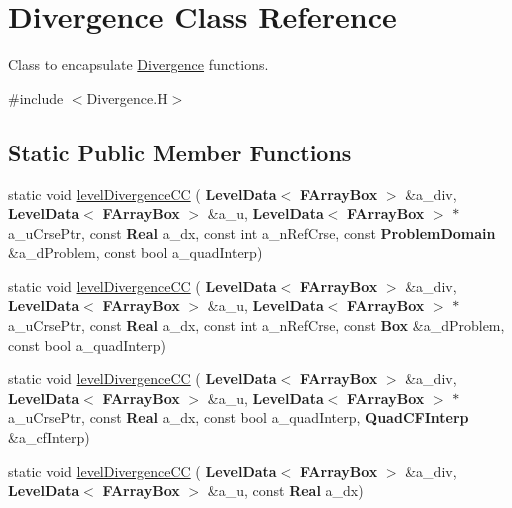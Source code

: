 \hypertarget{class_divergence}{}\section{Divergence Class Reference}
\label{class_divergence}


Class to encapsulate \hyperlink{class_divergence}{Divergence} functions.  




{\ttfamily \#include $<$Divergence.\+H$>$}

\subsection*{Static Public Member Functions}
\begin{DoxyCompactItemize}
\item 
static void \hyperlink{class_divergence_a85ddcbfb1ed4cd7e6624c33d0bd918f3}{level\+Divergence\+CC} (\textbf{ Level\+Data}$<$ \textbf{ F\+Array\+Box} $>$ \&a\+\_\+div, \textbf{ Level\+Data}$<$ \textbf{ F\+Array\+Box} $>$ \&a\+\_\+u, \textbf{ Level\+Data}$<$ \textbf{ F\+Array\+Box} $>$ $\ast$a\+\_\+u\+Crse\+Ptr, const \textbf{ Real} a\+\_\+dx, const int a\+\_\+n\+Ref\+Crse, const \textbf{ Problem\+Domain} \&a\+\_\+d\+Problem, const bool a\+\_\+quad\+Interp)
\item 
static void \hyperlink{class_divergence_a832809fde8a4344564e82a2a4881dccb}{level\+Divergence\+CC} (\textbf{ Level\+Data}$<$ \textbf{ F\+Array\+Box} $>$ \&a\+\_\+div, \textbf{ Level\+Data}$<$ \textbf{ F\+Array\+Box} $>$ \&a\+\_\+u, \textbf{ Level\+Data}$<$ \textbf{ F\+Array\+Box} $>$ $\ast$a\+\_\+u\+Crse\+Ptr, const \textbf{ Real} a\+\_\+dx, const int a\+\_\+n\+Ref\+Crse, const \textbf{ Box} \&a\+\_\+d\+Problem, const bool a\+\_\+quad\+Interp)
\item 
static void \hyperlink{class_divergence_a8714fec933884a4b9e6f8173e22574e3}{level\+Divergence\+CC} (\textbf{ Level\+Data}$<$ \textbf{ F\+Array\+Box} $>$ \&a\+\_\+div, \textbf{ Level\+Data}$<$ \textbf{ F\+Array\+Box} $>$ \&a\+\_\+u, \textbf{ Level\+Data}$<$ \textbf{ F\+Array\+Box} $>$ $\ast$a\+\_\+u\+Crse\+Ptr, const \textbf{ Real} a\+\_\+dx, const bool a\+\_\+quad\+Interp, \textbf{ Quad\+C\+F\+Interp} \&a\+\_\+cf\+Interp)
\item 
\mbox{\label{class_divergence_ae2ca2377231f1c6a272151d3ffe95432}} 
static void \hyperlink{class_divergence_ae2ca2377231f1c6a272151d3ffe95432}{level\+Divergence\+CC} (\textbf{ Level\+Data}$<$ \textbf{ F\+Array\+Box} $>$ \&a\+\_\+div, \textbf{ Level\+Data}$<$ \textbf{ F\+Array\+Box} $>$ \&a\+\_\+u, const \textbf{ Real} a\+\_\+dx)

\end{DoxyCompactItemize}

